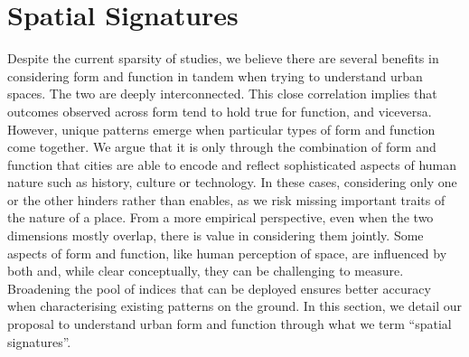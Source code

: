 \section{Spatial Signatures}
\label{sec:ss}

Despite the current sparsity of studies, we believe there are several benefits
in considering form and function in tandem when trying to understand urban
spaces.
The two are deeply interconnected. This close
correlation implies that outcomes observed across form tend to hold true for
function, and viceversa. However, unique patterns emerge when particular types
of form and function come together.
We argue that it is only through the combination of form and function
that cities are able to encode and reflect sophisticated aspects of human
nature such as history, culture or technology.
%
In these cases, considering only one or the other hinders rather than enables,
as we risk missing important traits of the nature of a place.
From a more empirical perspective, even when the two dimensions mostly
overlap, there is value in considering them jointly. Some aspects of form and
function, like human perception of space, are influenced by both and, while clear
conceptually, they can be challenging to measure. Broadening the
pool of indices that can be deployed ensures better accuracy when
characterising existing patterns on the ground.
%
In this section, we detail our proposal to understand urban form and function
through what we term “spatial signatures”.

